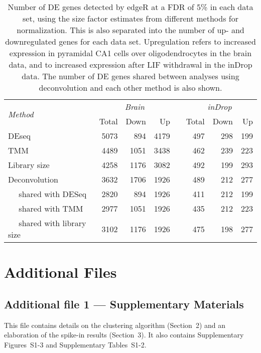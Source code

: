 \documentclass{bmcart}
\newcommand{\suppclustering}{2}
\newcommand{\suppspikesec}{3}
\begin{document}
\begin{backmatter}
\begin{table}[!h]
\caption{
    Number of DE genes detected by edgeR at a FDR of 5\% in each data set, using the size factor estimates from different methods for normalization.
    This is also separated into the number of up- and downregulated genes for each data set.
    Upregulation refers to increased expression in pyramidal CA1 cells over oligodendrocytes in the brain data, and to increased expression after LIF withdrawal in the inDrop data.
    The number of DE genes shared between analyses using deconvolution and each other method is also shown.
}
\begin{center}
\begin{tabular}{l r r r c r r r}
\hline
\multirow{2}{*}{\textit{Method}} & \multicolumn{3}{c}{\textit{Brain}} && \multicolumn{3}{c}{\textit{inDrop}}  \\
\cline{2-4}
\cline{6-8}
& Total & Down & Up && Total & Down & Up \\
\hline
DEseq                               & 5073 & 894  & 4179 && 497 & 298 & 199 \\
TMM                                 & 4489 & 1051 & 3438 && 462 & 239 & 223 \\
Library size                        & 4258 & 1176 & 3082 && 492 & 199 & 293 \\
Deconvolution                       & 3632 & 1706 & 1926 && 489 & 212 & 277 \\
$\quad$ shared with DESeq           & 2820 & 894  & 1926 && 411 & 212 & 199 \\
$\quad$ shared with TMM             & 2977 & 1051 & 1926 && 435 & 212 & 223 \\
$\quad$ shared with library size    & 3102 & 1176 & 1926 && 475 & 198 & 277 \\
\hline                                                   
\end{tabular}
\end{center}
\label{tab:real_de}
\end{table}


\section*{Additional Files}
\subsection*{Additional file 1 --- Supplementary Materials}
This file contains details on the clustering algorithm (Section~\suppclustering{}) and an elaboration of the spike-in results (Section~\suppspikesec{}).
It also contains Supplementary Figures~S1-3 and Supplementary Tables~S1-2.


\end{backmatter}
\end{document}
